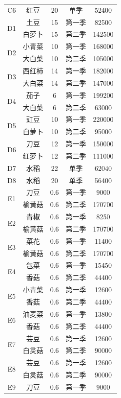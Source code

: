 \begin{longtable}{ccccc}
C6 & 红豆 & 20 & 单季 & 52400 \\
\multirow{2}{*}{D1} & 土豆 & 15 & 第一季 & 82500 \\
 & 白萝卜 & 15 & 第二季 & 142500 \\
\multirow{2}{*}{D2} & 小青菜 & 10 & 第一季 & 168000 \\
 & 大白菜 & 10 & 第二季 & 105000 \\
\multirow{2}{*}{D3} & 西红柿 & 14 & 第一季 & 182000 \\
 & 大白菜 & 14 & 第二季 & 147000 \\
\multirow{2}{*}{D4} & 茄子 & 6 & 第一季 & 199200 \\
 & 大白菜 & 6 & 第二季 & 63000 \\
\multirow{2}{*}{D5} & 豇豆 & 10 & 第一季 & 220000 \\
 & 白萝卜 & 10 & 第二季 & 95000 \\
\multirow{2}{*}{D6} & 刀豆 & 12 & 第一季 & 150000 \\
 & 红萝卜 & 12 & 第二季 & 111000 \\
D7 & 水稻 & 22 & 单季 & 62040 \\
D8 & 水稻 & 20 & 单季 & 56400 \\
\multirow{2}{*}{E1} & 刀豆 & 0.6 & 第一季 & 9000 \\
 & 榆黄菇 & 0.6 & 第二季 & 170700 \\
\multirow{2}{*}{E2} & 青椒 & 0.6 & 第一季 & 8250 \\
 & 榆黄菇 & 0.6 & 第二季 & 170700 \\
\multirow{2}{*}{E3} & 菜花 & 0.6 & 第一季 & 11400 \\
 & 榆黄菇 & 0.6 & 第二季 & 170700 \\
\multirow{2}{*}{E4} & 包菜 & 0.6 & 第一季 & 15450 \\
 & 香菇 & 0.6 & 第二季 & 44400 \\
\multirow{2}{*}{E5} & 小青菜 & 0.6 & 第一季 & 12600 \\
 & 香菇 & 0.6 & 第二季 & 44400 \\
\multirow{2}{*}{E6} & 油麦菜 & 0.6 & 第一季 & 13800 \\
 & 香菇 & 0.6 & 第二季 & 44400 \\
\multirow{2}{*}{E7} & 芸豆 & 0.6 & 第一季 & 12600 \\
 & 白灵菇 & 0.6 & 第二季 & 90000 \\
\multirow{2}{*}{E8} & 芸豆 & 0.6 & 第一季 & 12600 \\
 & 白灵菇 & 0.6 & 第二季 & 90000 \\
\multirow{2}{*}{E9} & 刀豆 & 0.6 & 第一季 & 9000 \\

\end{longtable}
